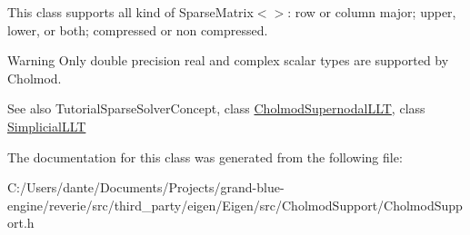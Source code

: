 This class supports all kind of Sparse\+Matrix$<$$>$\+: row or column major; upper, lower, or both; compressed or non compressed.

\begin{DoxyWarning}{Warning}
Only double precision real and complex scalar types are supported by Cholmod.
\end{DoxyWarning}
\begin{DoxySeeAlso}{See also}
Tutorial\+Sparse\+Solver\+Concept, class \mbox{\hyperlink{class_eigen_1_1_cholmod_supernodal_l_l_t}{Cholmod\+Supernodal\+L\+LT}}, class \mbox{\hyperlink{class_eigen_1_1_simplicial_l_l_t}{Simplicial\+L\+LT}} 
\end{DoxySeeAlso}


The documentation for this class was generated from the following file\+:\begin{DoxyCompactItemize}
\item 
C\+:/\+Users/dante/\+Documents/\+Projects/grand-\/blue-\/engine/reverie/src/third\+\_\+party/eigen/\+Eigen/src/\+Cholmod\+Support/Cholmod\+Support.\+h\end{DoxyCompactItemize}
